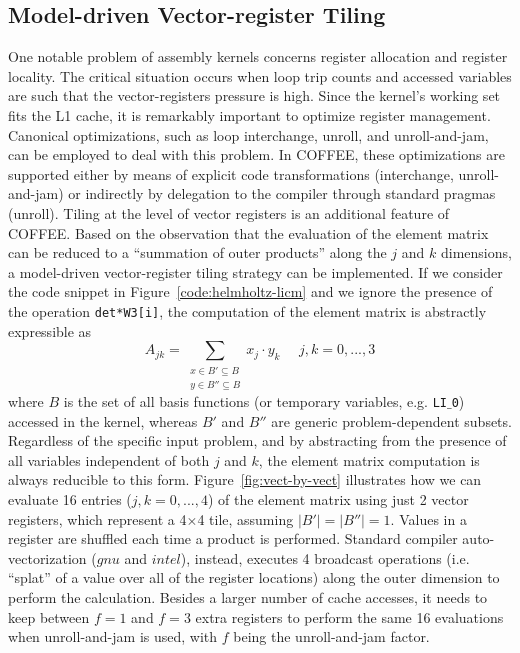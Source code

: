 \documentclass[conference]{IEEEtran}
\begin{document}
\subsection{Model-driven Vector-register Tiling}
One notable problem of assembly kernels concerns register allocation and register locality. The critical situation occurs when loop trip counts and accessed variables are such that the vector-registers pressure is high. Since the kernel's working set fits the L1 cache, it is remarkably important to optimize register management. Canonical optimizations, such as loop interchange, unroll, and unroll-and-jam, can be employed to deal with this problem. In COFFEE, these optimizations are supported either by means of explicit code transformations (interchange, unroll-and-jam) or indirectly by delegation to the compiler through standard pragmas (unroll). Tiling at the level of vector registers is an additional feature of COFFEE. Based on the observation that the evaluation of the element matrix can be reduced to a ``summation of outer products'' along the $j$ and $k$ dimensions, a model-driven vector-register tiling strategy can be implemented. If we consider the code snippet in Figure~\ref{code:helmholtz-licm} and we ignore the presence of the operation \texttt{det*W3[i]}, the computation of the element matrix is abstractly expressible as
\begin{equation}
\label{outer-product}
A_{jk} = \sum_{\substack{
  x \in B' \subseteq B \\
  y \in B'' \subseteq B}}
x_j\cdot y_k ~~~~~~ j,k = 0,...,3
\end{equation}
where $B$ is the set of all basis functions (or temporary variables, e.g. \texttt{LI$\_$0}) accessed in the kernel, whereas $B'$ and $B''$ are generic problem-dependent subsets. Regardless of the specific input problem, and by abstracting from the presence of all variables independent of both $j$ and $k$, the element matrix computation is always reducible to this form. Figure~\ref{fig:vect-by-vect} illustrates how we can evaluate 16 entries ($j,k=0,...,4$) of the element matrix using just 2 vector registers, which represent a 4$\times$4 tile, assuming $\vert B' \vert = \vert B'' \vert = 1$. Values in a register are shuffled each time a product is performed. Standard compiler auto-vectorization ($gnu$ and $intel$), instead, executes 4 broadcast operations (i.e. ``splat'' of a value over all of the register locations) along the outer dimension to perform the calculation. Besides a larger number of cache accesses, it needs to keep between $f=1$ and $f=3$ extra registers to perform the same 16 evaluations when unroll-and-jam is used, with $f$ being the unroll-and-jam factor.
\end{document}
